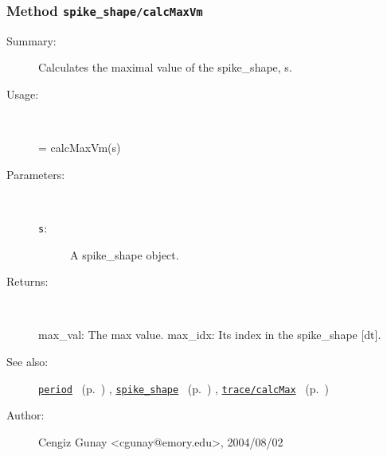 \subsubsection[Method \texttt{calcMaxVm}]{Method \texttt{spike\_shape/calcMaxVm}}%
%
\label{ref_spike_shape__calcMaxVm}%
\hypertarget{ref_spike_shape__calcMaxVm}{}%
\begin{description}
\item[Summary:]Calculates the maximal value of the spike\_shape, s. 
%
\item[Usage:]~%
\begin{lyxcode}%
[max\_val, max\_idx] = calcMaxVm(s)
%
\end{lyxcode}%
%
%
\item[Parameters:]~
\begin{description}%
\item[\texttt{s}:]
 A spike\_shape object.
\end{description}%
%
\item[Returns:
]~

	max\_val: The max value.
	max\_idx: Its index in the spike\_shape [dt].
%
%
\item[See also:]%
\hyperlink{ref_period}{\texttt{period}}%
\ (p.~\pageref{ref_period})%
%
, \hyperlink{ref_spike_shape}{\texttt{spike\_shape}}%
\ (p.~\pageref{ref_spike_shape})%
%
, \hyperlink{ref_trace__calcMax}{\texttt{trace/calcMax}}%
\ (p.~\pageref{ref_trace__calcMax})%
%
%
\item[Author:]%
Cengiz Gunay <cgunay@emory.edu>, 2004/08/02
%
\end{description}
\methodline%
